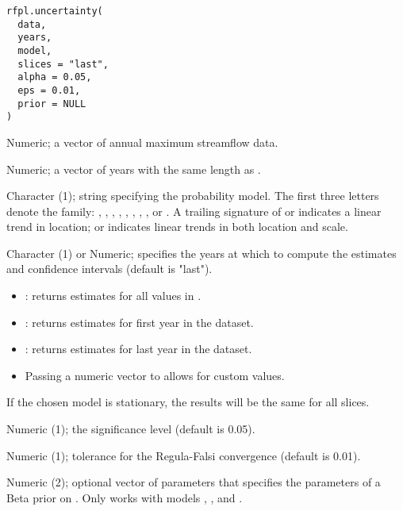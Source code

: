 \documentclass[a4paper]{book}
\begin{document}
%
\begin{Usage}
\begin{verbatim}
rfpl.uncertainty(
  data,
  years,
  model,
  slices = "last",
  alpha = 0.05,
  eps = 0.01,
  prior = NULL
)
\end{verbatim}
\end{Usage}
%
\begin{Arguments}
\begin{ldescription}
\item[\code{data}] Numeric; a vector of annual maximum streamflow data.

\item[\code{years}] Numeric; a vector of years with the same length as .

\item[\code{model}] Character (1); string specifying the probability model. The first three
letters denote the family: , , , , , , ,
, or . A trailing signature of  or  indicates a linear trend
in location;  or  indicates linear trends in both location and scale.

\item[\code{slices}] Character (1) or Numeric; specifies the years at which
to compute the estimates and confidence intervals (default is "last").
\begin{itemize}

\item{} : returns estimates for all values in .
\item{} : returns estimates for first year in the dataset.
\item{} : returns estimates for last year in the dataset.
\item{} Passing a numeric vector to  allows for custom values.

\end{itemize}


If the chosen model is stationary, the results will be the same for all slices.

\item[\code{alpha}] Numeric (1); the significance level (default is 0.05).

\item[\code{eps}] Numeric (1); tolerance for the Regula-Falsi convergence (default is 0.01).

\item[\code{prior}] Numeric (2); optional vector of parameters  that specifies
the parameters of a Beta prior on \eqn{\kappa}{}. Only works with models ,
, and .
\end{ldescription}
\end{Arguments}
\end{document}
